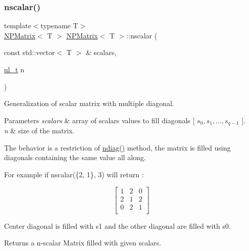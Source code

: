 \subsubsection{\texorpdfstring{nscalar()}{nscalar()}}
{\footnotesize\ttfamily template$<$typename T$>$ \\
\mbox{\hyperlink{class_n_p_matrix}{N\+P\+Matrix}}$<$ T $>$ \mbox{\hyperlink{class_n_p_matrix}{N\+P\+Matrix}}$<$ T $>$\+::nscalar (\begin{DoxyParamCaption}\item[{const std\+::vector$<$ T $>$ \&}]{scalars,  }\item[{\mbox{\hyperlink{group___n_algebra_ga1b140a2034db3f5dfe18a987745df43a}{ul\+\_\+t}}}]{n }\end{DoxyParamCaption})\hspace{0.3cm}{\ttfamily [static]}}



Generalization of scalar matrix with multiple diagonal. 


\begin{DoxyParams}{Parameters}
{\em scalars} & array of scalars values to fill diagonals {\ttfamily \mbox{[}} $ s_0, s_1, ..., s_{q-1} $ {\ttfamily \mbox{]}}. \\
\hline
{\em n} & size of the matrix.\\
\hline
\end{DoxyParams}
The behavior is a restriction of {\ttfamily \mbox{\hyperlink{class_n_p_matrix_a16aa6a18c33005300049ab1a39cbfbc2}{ndiag()}}} method, the matrix is filled using diagonals containing the same value all along.

For example if {\ttfamily nscalar(\{2, 1\}, 3)} will return \+:

\[ \begin{bmatrix} 1 & 2 & 0 \\ 2 & 1 & 2 \\ 0 & 2 & 1 \\ \end{bmatrix} \]

Center diagonal is filled with s1 and the other diagonal are filled with s0. \begin{DoxyReturn}{Returns}
a n-\/scalar Matrix filled with given {\ttfamily scalars}. 
\end{DoxyReturn}
\mbox{\label{class_n_p_matrix_aafbf2155265a070f3ae418828e40359e}} 
